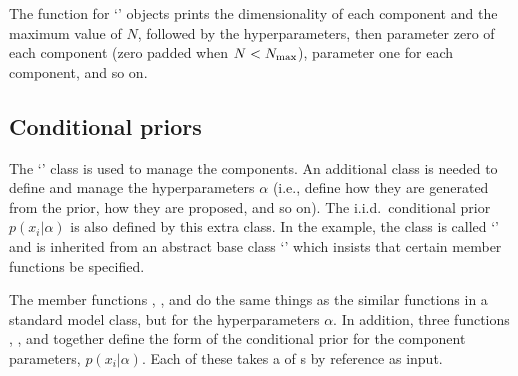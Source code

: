 \documentclass[article]{jss}
\begin{document}
The  function for `' objects prints the
dimensionality of each component and the maximum value of $N$,
followed by the hyperparameters, then parameter zero of each component
(zero padded when $N<N_{\rm max}$), parameter one for each component,
and so on.

\subsection{Conditional priors}
The `' class is used to manage the components. An
additional class is needed to define and manage the hyperparameters
$\alpha$ (i.e., define how they are generated from the prior, how they
are proposed, and so on). The i.i.d.~conditional prior
$p(x_i | \alpha)$ is also defined by this extra class.  In the
example, the class is called `' and is
inherited from an abstract base class `'
which insists that certain member functions be specified.

The member functions , , and
 do the same things as the similar functions in a standard model
class, but for the hyperparameters $\alpha$. 
In addition, three functions
, , and 
together define the form of the conditional prior for the
component parameters, $p(x_i | \alpha)$. Each of these takes a
 of s by reference as input.
\end{document}

